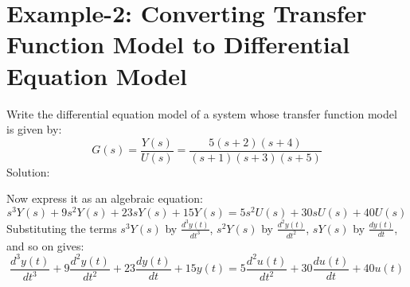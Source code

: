 \documentclass[../notes-main.tex]{subfiles}
\begin{document}
\section{Example-2: Converting Transfer Function Model to Differential Equation Model}

Write the differential equation model of a system whose transfer function model is given by:
\[
G(s) = \frac{Y(s)}{U(s)} = \frac{5(s+2)(s+4)}{(s+1)(s+3)(s+5)}
\]
Solution:

Now express it as an algebraic equation:
\[
s^3Y(s) + 9s^2Y(s) + 23sY(s) + 15Y(s) = 5s^2U(s) + 30sU(s) + 40U(s)
\]
Substituting the terms \( s^3Y(s) \) by \( \frac{d^3y(t)}{dt^3} \), \( s^2Y(s) \) by \( \frac{d^2y(t)}{dt^2} \), \( sY(s) \) by \( \frac{dy(t)}{dt} \), and so on gives:
\[
\frac{d^3y(t)}{dt^3} + 9\frac{d^2y(t)}{dt^2} + 23\frac{dy(t)}{dt} + 15y(t) = 5\frac{d^2u(t)}{dt^2} + 30\frac{du(t)}{dt} + 40u(t)
\]
\end{document}
